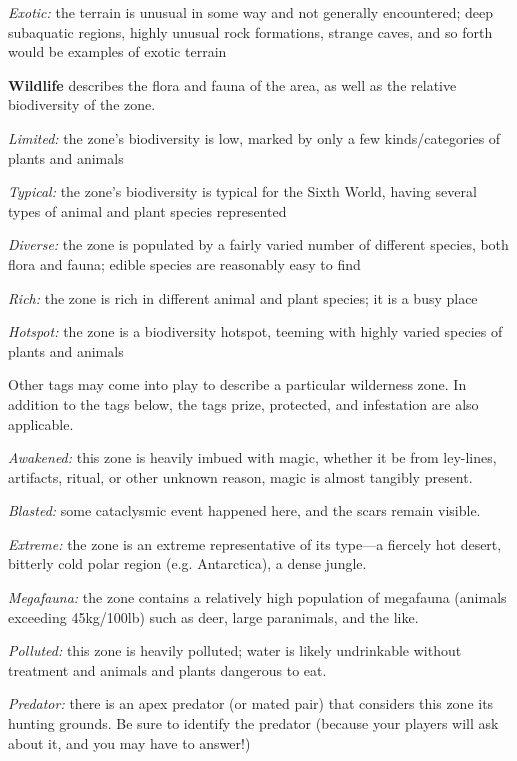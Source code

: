 \documentclass[oneside,10pt]{article}
\begin{document}
\begin{multicols}{2}
\begin{dent}
\textit{Exotic:} the terrain is unusual in some way and not generally encountered; deep subaquatic regions, highly unusual
rock formations, strange caves, and so forth would be examples of exotic terrain
\end{dent}

\textbf{Wildlife} describes the flora and fauna of the area, as well as
the relative biodiversity of the zone.
\begin{dent}

\textit{Limited:} the zone’s biodiversity is low, marked by only a
few kinds/categories of plants and animals

\textit{Typical:} the zone’s biodiversity is typical for the Sixth
World, having several types of animal and plant species
represented

\textit{Diverse:} the zone is populated by a fairly varied number of
different species, both flora and fauna; edible species are
reasonably easy to find

\textit{Rich:} the zone is rich in different animal and plant species;
it is a busy place

\textit{Hotspot:} the zone is a biodiversity hotspot, teeming with
highly varied species of plants and animals
\end{dent}

Other tags may come into play to describe a particular wilderness zone. In addition to the tags below, the tags prize,
protected, and infestation are also applicable.
\begin{dent}

\textit{Awakened:} this zone is heavily imbued with magic, whether it be from ley-lines, artifacts, ritual, or other unknown
reason, magic is almost tangibly present.

\textit{Blasted:} some cataclysmic event happened here, and the
scars remain visible.

\textit{Extreme:} the zone is an extreme representative of its
type—a fiercely hot desert, bitterly cold polar region (e.g.
 Antarctica), a dense jungle.

\textit{Megafauna:} the zone contains a relatively high population
of megafauna (animals exceeding 45kg/100lb) such as
deer, large paranimals, and the like.

\textit{Polluted:} this zone is heavily polluted; water is likely undrinkable without treatment and animals and plants dangerous to eat.

\textit{Predator:} there is an apex predator (or mated pair) that
considers this zone its hunting grounds. Be sure to identify
the predator (because your players will ask about it, and
you may have to answer!)


\end{dent}
\end{multicols}
\end{document}
